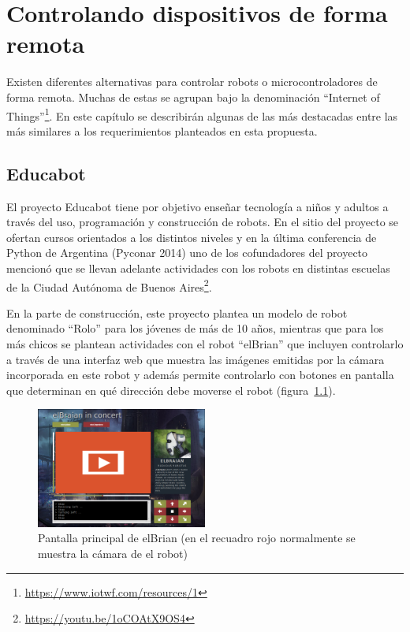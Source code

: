 \chapter{Controlando dispositivos de forma remota}\label{cha:arte}

Existen diferentes alternativas para controlar robots o microcontroladores
de forma remota. Muchas de estas se agrupan bajo la denominación
``Internet of Things''\footnote{\url{https://www.iotwf.com/resources/1}}.
En este capítulo se describirán algunas de las
más destacadas entre las más similares a los requerimientos planteados en
esta propuesta.


\section{Educabot}
El proyecto Educabot tiene por
objetivo enseñar tecnología a niños y adultos a través
del uso, programación y construcción de robots. En el sitio del proyecto
se ofertan cursos orientados a los distintos niveles y
en la última conferencia de Python de Argentina (Pyconar 2014) uno de
los cofundadores del proyecto mencionó que se llevan adelante actividades
con los robots
en distintas escuelas de la Ciudad Autónoma de Buenos
Aires\footnote{\url{https://youtu.be/1oCOAtX9OS4}}.


En la parte de construcción, este proyecto plantea un modelo de robot
denominado
``Rolo'' para los jóvenes de más de 10 años, mientras que para los más chicos
se plantean actividades con el robot ``elBrian'' que incluyen
controlarlo a través de una interfaz web que muestra las imágenes emitidas
por la cámara incorporada en este robot y además permite controlarlo con
botones en pantalla que determinan en qué dirección debe moverse el robot
(figura~\ref{fig:elbrian}).

\begin{figure}
    \centering
    \includegraphics[width=0.5\textwidth]{figures/elbrian-1}
    \caption{Pantalla principal de elBrian (en el recuadro rojo normalmente
        se muestra la cámara de el robot)}
    \label{fig:elbrian}
\end{figure}


